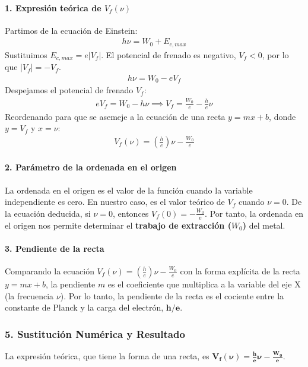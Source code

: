 \paragraph{1. Expresión teórica de $V_f(\nu)$}
Partimos de la ecuación de Einstein:
\begin{gather}
    h\nu = W_0 + E_{c,max}
\end{gather}
Sustituimos $E_{c,max} = e|V_f|$. El potencial de frenado es negativo, $V_f < 0$, por lo que $|V_f| = -V_f$.
\begin{gather}
    h\nu = W_0 - eV_f
\end{gather}
Despejamos el potencial de frenado $V_f$:
\begin{gather}
    eV_f = W_0 - h\nu \implies V_f = \frac{W_0}{e} - \frac{h}{e}\nu
\end{gather}
Reordenando para que se asemeje a la ecuación de una recta $y=mx+b$, donde $y=V_f$ y $x=\nu$:
\begin{gather}
    V_f(\nu) = \left(\frac{h}{e}\right)\nu - \frac{W_0}{e}
\end{gather}

\paragraph{2. Parámetro de la ordenada en el origen}
La ordenada en el origen es el valor de la función cuando la variable independiente es cero. En nuestro caso, es el valor teórico de $V_f$ cuando $\nu=0$.
De la ecuación deducida, si $\nu=0$, entonces $V_f(0) = -\frac{W_0}{e}$.
Por tanto, la ordenada en el origen nos permite determinar el \textbf{trabajo de extracción ($W_0$)} del metal.

\paragraph{3. Pendiente de la recta}
Comparando la ecuación $V_f(\nu) = \left(\frac{h}{e}\right)\nu - \frac{W_0}{e}$ con la forma explícita de la recta $y=mx+b$, la pendiente $m$ es el coeficiente que multiplica a la variable del eje X (la frecuencia $\nu$).
Por lo tanto, la pendiente de la recta es el cociente entre la constante de Planck y la carga del electrón, $\boldsymbol{h/e}$.

\subsubsection*{5. Sustitución Numérica y Resultado}

\begin{cajaresultado}
La expresión teórica, que tiene la forma de una recta, es $\boldsymbol{V_f(\nu) = \frac{h}{e}\nu - \frac{W_0}{e}}$.
\end{cajaresultado}

